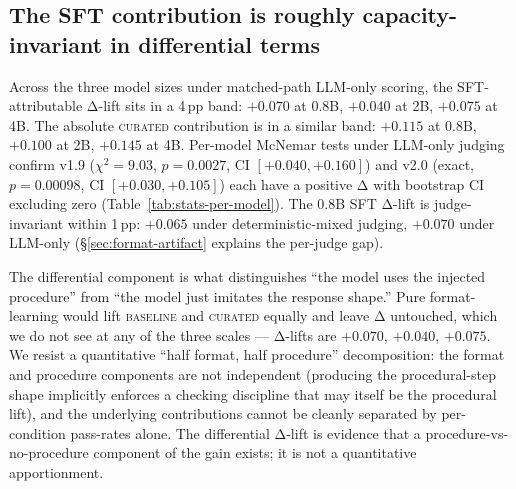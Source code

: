 \documentclass[10pt]{article}
\newcommand{\BL}{\textsc{baseline}\xspace}
\newcommand{\CU}{\textsc{curated}\xspace}
\begin{document}
\subsection{The SFT contribution is roughly capacity-invariant in differential terms}\label{sec:uniformity}
Across the three model sizes under matched-path LLM-only scoring, the SFT-attributable Δ-lift sits in a 4\,pp band: $+0.070$ at 0.8B, $+0.040$ at 2B, $+0.075$ at 4B. The absolute \CU{} contribution is in a similar band: $+0.115$ at 0.8B, $+0.100$ at 2B, $+0.145$ at 4B. Per-model McNemar tests under LLM-only judging confirm v1.9 ($\chi^2=9.03$, $p=0.0027$, CI $[+0.040, +0.160]$) and v2.0 (exact, $p=0.00098$, CI $[+0.030, +0.105]$) each have a positive Δ with bootstrap CI excluding zero (Table~\ref{tab:stats-per-model}). The 0.8B SFT Δ-lift is judge-invariant within 1\,pp: $+0.065$ under deterministic-mixed judging, $+0.070$ under LLM-only (\S\ref{sec:format-artifact} explains the per-judge gap).

The differential component is what distinguishes ``the model uses the injected procedure'' from ``the model just imitates the response shape.'' Pure format-learning would lift \BL{} and \CU{} equally and leave Δ untouched, which we do not see at any of the three scales --- Δ-lifts are $+0.070$, $+0.040$, $+0.075$. We resist a quantitative ``half format, half procedure'' decomposition: the format and procedure components are not independent (producing the procedural-step shape implicitly enforces a checking discipline that may itself be the procedural lift), and the underlying contributions cannot be cleanly separated by per-condition pass-rates alone. The differential Δ-lift is evidence that a procedure-vs-no-procedure component of the gain exists; it is not a quantitative apportionment.
\end{document}
